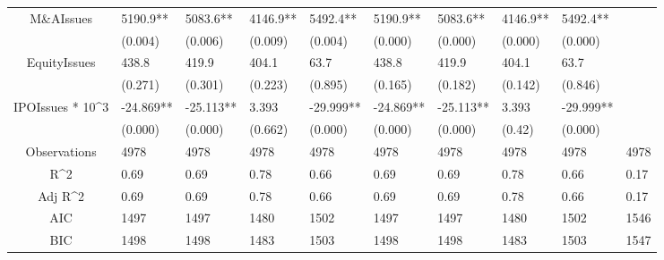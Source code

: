 \documentclass{article}
\begin{document}
\begin{table}[H]
\begin{tabular}{|clllllllll|}
  M\&AIssues & 5190.9** & 5083.6** & 4146.9** & 5492.4** & 5190.9** & 5083.6** & 4146.9** & 5492.4** &  \\ 
   & (0.004) & (0.006) & (0.009) & (0.004) & (0.000) & (0.000) & (0.000) & (0.000) &  \\ 
  EquityIssues & 438.8 & 419.9 & 404.1 & 63.7 & 438.8 & 419.9 & 404.1 & 63.7 &  \\ 
   & (0.271) & (0.301) & (0.223) & (0.895) & (0.165) & (0.182) & (0.142) & (0.846) &  \\ 
  IPOIssues * 10^3 & -24.869** & -25.113** & 3.393 & -29.999** & -24.869** & -25.113** & 3.393 & -29.999** &  \\ 
   & (0.000) & (0.000) & (0.662) & (0.000) & (0.000) & (0.000) & (0.42) & (0.000) &  \\ 
  \hline 
 Observations & 4978 & 4978 & 4978 & 4978 & 4978 & 4978 & 4978 & 4978 & 4978 \\ 
  R^2 & 0.69 & 0.69 & 0.78 & 0.66 & 0.69 & 0.69 & 0.78 & 0.66 & 0.17 \\ 
  Adj R^2 & 0.69 & 0.69 & 0.78 & 0.66 & 0.69 & 0.69 & 0.78 & 0.66 & 0.17 \\ 
  AIC & 1497 & 1497 & 1480 & 1502 & 1497 & 1497 & 1480 & 1502 & 1546 \\ 
  BIC & 1498 & 1498 & 1483 & 1503 & 1498 & 1498 & 1483 & 1503 & 1547 \\ 
   \hline
\end{tabular}
 
\end{table}
\end{document}
